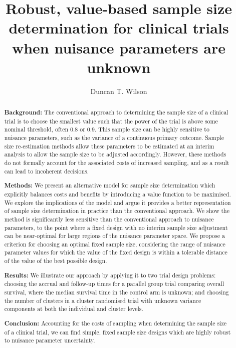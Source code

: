 \documentclass[sagev]{sagej}
\begin{document}

\title{Robust, value-based sample size determination for clinical trials when nuisance parameters are unknown}

\author{Duncan T. Wilson}%



\begin{abstract}

\textbf{Background:} The conventional approach to determining the sample size of a clinical trial is to choose the smallest value such that the power of the trial is above some nominal threshold, often 0.8 or 0.9. This sample size can be highly sensitive to nuisance parameters, such as the variance of a continuous primary outcome. Sample size re-estimation methods allow these parameters to be estimated at an interim analysis to allow the sample size to be adjusted accordingly. However, these methods do not formally account for the associated costs of increased sampling, and as a result can lead to incoherent decisions.

\textbf{Methods:} We present an alternative model for sample size determination which explicitly balances costs and benefits by introducing a value function to be maximised. We explore the implications of the model and argue it provides a better representation of sample size determination in practice than the conventional approach. We show the method is significantly less sensitive than the conventional approach to nuisance parameters, to the point where a fixed design with no interim sample size adjustment can be near-optimal for large regions of the nuisance parameter space. We propose a criterion for choosing an optimal fixed sample size, considering the range of nuisance parameter values for which the value of the fixed design is within a tolerable distance of the value of the best possible design.

\textbf{Results:} We illustrate our approach by applying it to two trial design problems: choosing the accrual and follow-up times for a parallel group trial comparing overall survival, where the median survival time in the control arm is unknown; and choosing the number of clusters in a cluster randomised trial with unknown variance components at both the individual and cluster levels.

\textbf{Conclusion:} Accounting for the costs of sampling when determining the sample size of a clinical trial,  we can find simple, fixed sample size designs which are highly robust to nuisance parameter uncertainty.
\end{abstract}
\end{document}
